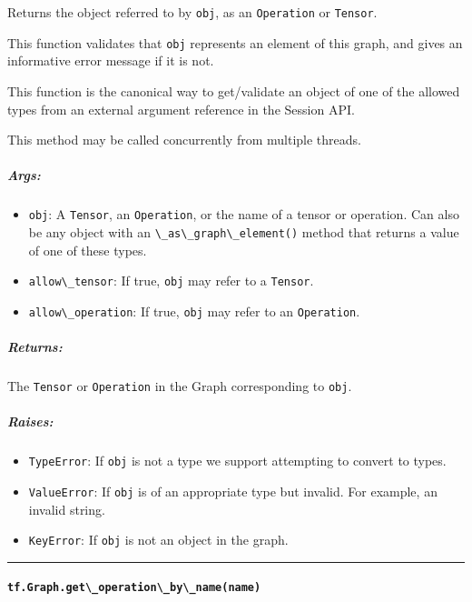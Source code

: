 Returns the object referred to by \lstinline{obj}, as an \lstinline{Operation}
or \lstinline{Tensor}.

This function validates that \lstinline{obj} represents an element of this
graph, and gives an informative error message if it is not.

This function is the canonical way to get/validate an object of one of
the allowed types from an external argument reference in the Session
API.

This method may be called concurrently from multiple threads.

\subparagraph{Args: }\label{args-6}

\begin{itemize}
\tightlist
\item
  \lstinline{obj}: A \lstinline{Tensor}, an \lstinline{Operation}, or the name of
  a tensor or operation. Can also be any object with an
  \lstinline{\_as\_graph\_element()} method that returns a value of one of
  these types.
\item
  \lstinline{allow\_tensor}: If true, \lstinline{obj} may refer to a
  \lstinline{Tensor}.
\item
  \lstinline{allow\_operation}: If true, \lstinline{obj} may refer to an
  \lstinline{Operation}.
\end{itemize}

\subparagraph{Returns: }\label{returns-6}

The \lstinline{Tensor} or \lstinline{Operation} in the Graph corresponding to
\lstinline{obj}.

\subparagraph{Raises: }\label{raises-1}

\begin{itemize}
\tightlist
\item
  \lstinline{TypeError}: If \lstinline{obj} is not a type we support
  attempting to convert to types.
\item
  \lstinline{ValueError}: If \lstinline{obj} is of an appropriate type but
  invalid. For example, an invalid string.
\item
  \lstinline{KeyError}: If \lstinline{obj} is not an object in the graph.
\end{itemize}

\begin{center}\rule{0.5\linewidth}{\linethickness}\end{center}

\paragraph{\texorpdfstring{\lstinline{tf.Graph.get\_operation\_by\_name(name)}
}{tf.Graph.get\_operation\_by\_name(name) }}\label{tf.graph.getux5foperationux5fbyux5fnamename}

